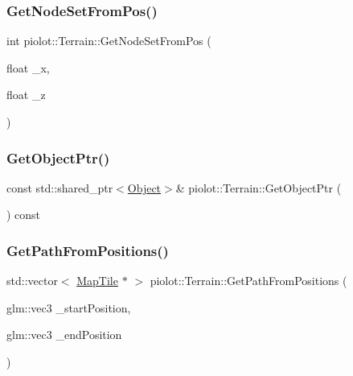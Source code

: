 \subsubsection{\texorpdfstring{Get\+Node\+Set\+From\+Pos()}{GetNodeSetFromPos()}}
{\footnotesize\ttfamily int piolot\+::\+Terrain\+::\+Get\+Node\+Set\+From\+Pos (\begin{DoxyParamCaption}\item[{float}]{\+\_\+x,  }\item[{float}]{\+\_\+z }\end{DoxyParamCaption})}

\mbox{\label{classpiolot_1_1_terrain_a445ca2537de1765c3ae2c8073db1603f}} 
\subsubsection{\texorpdfstring{Get\+Object\+Ptr()}{GetObjectPtr()}}
{\footnotesize\ttfamily const std\+::shared\+\_\+ptr$<$\mbox{\hyperlink{classpiolot_1_1_object}{Object}}$>$\& piolot\+::\+Terrain\+::\+Get\+Object\+Ptr (\begin{DoxyParamCaption}{ }\end{DoxyParamCaption}) const\hspace{0.3cm}{\ttfamily [inline]}}

\mbox{\label{classpiolot_1_1_terrain_a27ab93eb2d5e058f4bfa9e6929b324bc}} 
\subsubsection{\texorpdfstring{Get\+Path\+From\+Positions()}{GetPathFromPositions()}}
{\footnotesize\ttfamily std\+::vector$<$ \mbox{\hyperlink{classpiolot_1_1_map_tile}{Map\+Tile}} $\ast$ $>$ piolot\+::\+Terrain\+::\+Get\+Path\+From\+Positions (\begin{DoxyParamCaption}\item[{glm\+::vec3}]{\+\_\+start\+Position,  }\item[{glm\+::vec3}]{\+\_\+end\+Position }\end{DoxyParamCaption})}



